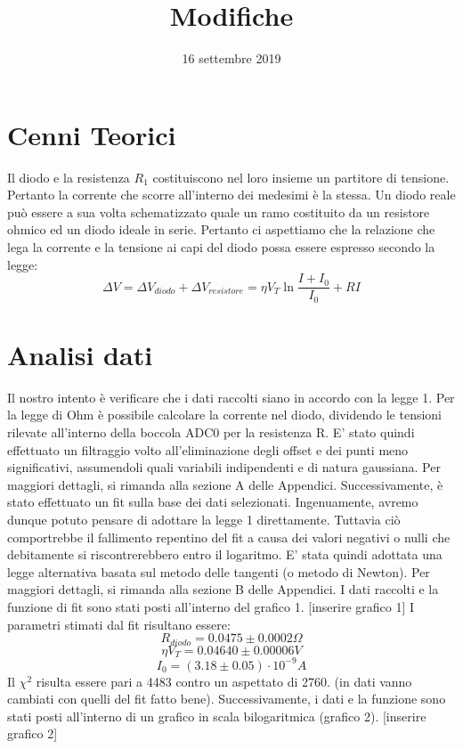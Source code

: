 \documentclass[11pt, a4paper] {article}
\title{Modifiche}
\date{16 settembre 2019}
\begin{document}
\maketitle
\section{Cenni Teorici}
Il diodo e la resistenza $R_1$ costituiscono nel loro insieme un partitore di tensione. Pertanto la corrente che scorre all'interno dei medesimi è la stessa. Un diodo reale può essere a sua volta schematizzato quale un ramo costituito da un resistore ohmico ed un diodo ideale in serie. Pertanto ci aspettiamo che la relazione che lega la corrente e la tensione ai capi del diodo possa essere espresso secondo la legge:
\begin{equation}
\Delta V = \Delta V_{diodo} + \Delta V_{resistore} = \eta V_T  \ln{\frac{I+I_0}{I_0}} + RI
\end{equation}
\section{Analisi dati}
Il nostro intento è verificare che i dati raccolti siano in accordo con la legge 1. Per la legge di Ohm è possibile calcolare la corrente nel diodo, dividendo le tensioni rilevate all'interno della boccola ADC0 per la resistenza R. E'  stato quindi effettuato un filtraggio volto all'eliminazione degli offset e dei punti meno significativi, assumendoli quali variabili indipendenti e di natura gaussiana. Per maggiori dettagli, si rimanda alla sezione A delle Appendici.
Successivamente, è stato effettuato un fit sulla base dei dati selezionati. Ingenuamente, avremo dunque potuto pensare di adottare la legge 1 direttamente. Tuttavia ciò comportrebbe il fallimento repentino del fit a causa dei valori negativi o nulli che debitamente si riscontrerebbero entro il logaritmo. E' stata quindi adottata una legge alternativa basata sul metodo delle tangenti (o metodo di Newton). Per maggiori dettagli, si rimanda alla sezione B delle Appendici. I dati raccolti e la funzione di fit sono stati posti all'interno del grafico 1.
[inserire grafico 1]
I parametri stimati dal fit risultano essere:
\begin{equation}
R_{diodo}= 0.0475 \pm 0.0002  \Omega
\end{equation}
\begin{equation}
\eta V_T = 0.04640 \pm 0.00006 V
\end{equation}
\begin{equation}
I_0 = (3.18 \pm 0.05) \cdot 10^{-9} A
\end{equation}
Il $\chi^2$ risulta essere pari a 4483 contro un aspettato di 2760. (in dati vanno cambiati con quelli del fit fatto bene). Successivamente, i dati e la funzione sono stati posti all'interno di un grafico in scala bilogaritmica (grafico 2).
[inserire grafico 2]
\end{document}
